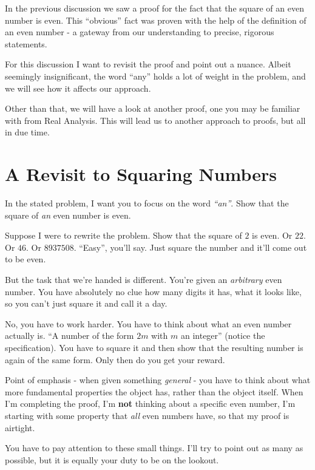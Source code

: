

In the previous discussion we saw a proof for the fact that the square of an even number is even. This ``obvious'' fact was proven with the help of the definition of an even number - a gateway from our understanding to precise, rigorous statements.

For this discussion I want to revisit the proof and point out a nuance. Albeit seemingly insignificant, the word ``any'' holds a lot of weight in the problem, and we will see how it affects our approach.

Other than that, we will have a look at another proof, one you may be familiar with from Real Analysis. This will lead us to another approach to proofs, but all in due time.

\section*{A Revisit to Squaring Numbers}
In the stated problem, I want you to focus on the word \textit{``an''}. Show that the square of \textit{an} even number is even.

Suppose I were to rewrite the problem. Show that the square of $2$ is even. Or $22$. Or $46$. Or $8937508$. ``Easy'', you'll say. Just square the number and it'll come out to be even.

But the task that we're handed is different. You're given an \textit{arbitrary} even number. You have absolutely no clue how many digits it has, what it looks like, so you can't just square it and call it a day.

No, you have to work harder. You have to think about what an even number actually is. ``A number of the form $2m$ with $m$ an integer'' (notice the specification). You have to square it and then show that the resulting number is again of the same form. Only then do you get your reward.

Point of emphasis - when given something \textit{general} - you have to think about what more fundamental properties the object has, rather than the object itself. When I'm completing the proof, I'm \textbf{not} thinking about a specific even number, I'm starting with some property that \textit{all} even numbers have, so that my proof is airtight.

You have to pay attention to these small things. I'll try to point out as many as possible, but it is equally your duty to be on the lookout.

